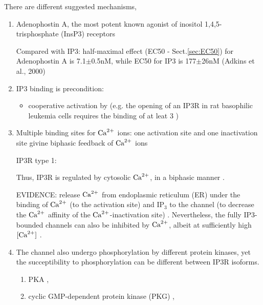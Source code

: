 There are different suggested mechanisms, 
\begin{enumerate}
  \item Adenophostin A, the most potent known agonist of inositol
  1,4,5-trisphosphate (InsP3) receptors
  
Compared with IP3: half-maximal effect (EC50 - Sect.\ref{sec:EC50}) for
Adenophostin A is 7.1$\pm$0.5nM, while EC50 for IP3 is 177$\pm$26nM (Adkins et
al., 2000)
  
  \item IP3 binding is precondition:

 
 \begin{itemize}
   \item cooperative activation by \IPthree (e.g. the opening of an IP3R in rat
  basophilic leukemia cells requires the binding of at leat 3 \IPthree
  \citep{meyer1988})
  \end{itemize}
  
  
  \item Multiple binding sites for ${\text{Ca}^{2+}}$ ions: one activation site and one
  inactivation site givine  biphasic feedback of ${\text{Ca}^{2+}}$ ions
  \citep{bezprozvanny1991ip3r}
  
IP3R type 1: \citep{sienaert1996,sienaert1997}

Thus, IP3R is regulated by cytosolic ${\text{Ca}^{2+}}$, in a biphasic manner
\citep{iino1992}. 

EVIDENCE: \tIPthreeR release ${\text{Ca}^{2+}}$ from endoplasmic reticulum (ER)
under the binding of ${\text{Ca}^{2+}}$ (to the activation site) and IP$_3$ to the
channel (to decrease the ${\text{Ca}^{2+}}$ affinity of the ${\text{Ca}^{2+}}$-inactivation site)
\citep{berridge1993, taylor2004, bezprozvanny2005ip3r, foskett2007ip3r}.
Nevertheless, the fully IP3-bounded channels can also be inhibited by ${\text{Ca}^{2+}}$,
albeit at sufficiently high $[{\text{Ca}^{2+}}]$ \citep{mak2001}.

  \item  The channel also undergo phosphorylation by different protein kinases,
  yet the succeptibility to phosphorylation can be different between IP3R
  isoforms.
  
  \begin{enumerate}
    \item PKA \citep{furuichi1989, joseph1993, wojcikiewicz1998}, 
    
    \item cyclic GMP-dependent protein kinase (PKG)
    \citep{komalavilas1994,koga1994, rooney1996}, 
    

\end{enumerate}
\end{enumerate}
